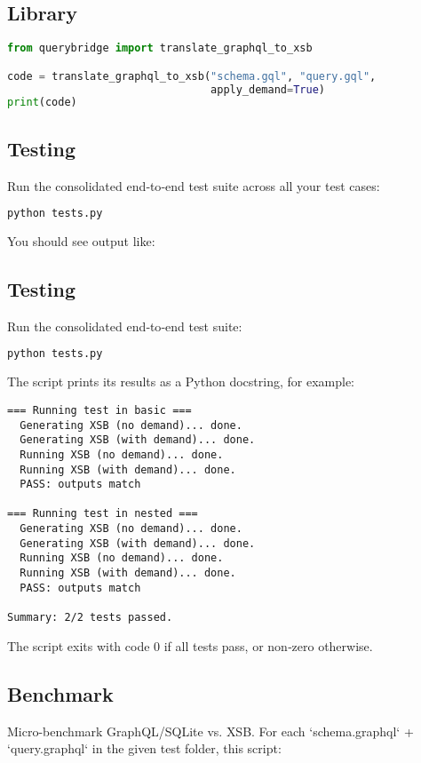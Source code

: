 \documentclass[11pt]{article}
\begin{document}
\subsection{Library}
\begin{lstlisting}[language=Python]
from querybridge import translate_graphql_to_xsb

code = translate_graphql_to_xsb("schema.gql", "query.gql",
                                apply_demand=True)
print(code)
\end{lstlisting}


\subsection{Testing}

Run the consolidated end‐to‐end test suite across all your test cases:

\begin{lstlisting}[language=bash]
python tests.py
\end{lstlisting}

You should see output like:

\subsection{Testing}

Run the consolidated end‐to‐end test suite:

\begin{lstlisting}[language=bash]
python tests.py
\end{lstlisting}

The script prints its results as a Python docstring, for example:

\begin{lstlisting}
=== Running test in basic ===
  Generating XSB (no demand)... done.
  Generating XSB (with demand)... done.
  Running XSB (no demand)... done.
  Running XSB (with demand)... done.
  PASS: outputs match

=== Running test in nested ===
  Generating XSB (no demand)... done.
  Generating XSB (with demand)... done.
  Running XSB (no demand)... done.
  Running XSB (with demand)... done.
  PASS: outputs match

Summary: 2/2 tests passed.
\end{lstlisting}

The script exits with code 0 if all tests pass, or non‐zero otherwise.




\subsection{Benchmark}
Micro-benchmark GraphQL/SQLite vs. XSB. For each `schema.graphql` + `query.graphql` in the given test folder, this script:
\end{document}
